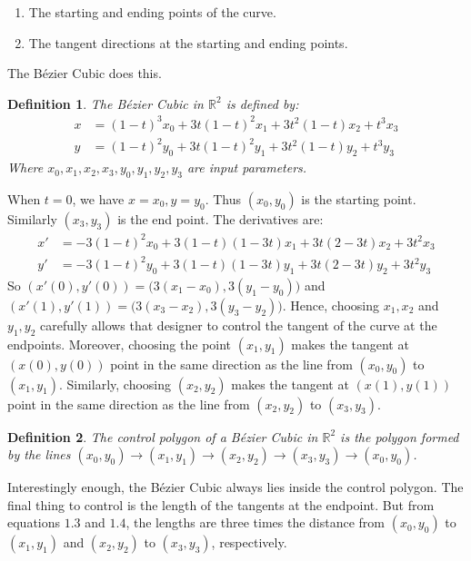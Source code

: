 \documentclass{article}
\theoremstyle{mystyle}
\newtheorem{definition}{Definition}[section]
\begin{document}
\begin{enumerate}
    \item The starting and ending points of the curve.
    \item The tangent directions at the starting and ending points.
\end{enumerate}
The B\'{e}zier Cubic does this.
\begin{definition}
The B\'{e}zier Cubic in $\mathbb{R}^2$ is defined by:
\begin{align*}
    x &= (1-t)^3 x_0+3t(1-t)^2x_1+3t^2(1-t)x_2+t^3x_3 \\
    y &= (1-t)^2 y_0+3t(1-t)^2y_1+3t^2(1-t)y_2+t^3y_3
\end{align*}
Where $x_0,x_1,x_2,x_3,y_0,y_1,y_2,y_3$ are input parameters.
\end{definition}
When $t=0$, we have $x = x_0, y=y_0$. Thus $(x_0,y_0)$ is the starting point. Similarly $(x_3,y_3)$ is the end point. The derivatives are:
\begin{align*}
    x' &= -3(1-t)^2x_0 + 3(1-t)(1-3t)x_1+3t(2-3t)x_2+3t^2x_3 \\
    y' &= -3(1-t)^2y_0 + 3(1-t)(1-3t)y_1+3t(2-3t)y_2+3t^2y_3
\end{align*}
So $(x'(0),y'(0)) = \big(3(x_1-x_0),3(y_1-y_0)\big)$ and $(x'(1),y'(1)) = \big(3(x_3-x_2),3(y_3-y_2)\big)$. Hence, choosing $x_1,x_2$ and $y_1,y_2$ carefully allows that designer to control the tangent of the curve at the endpoints. Moreover, choosing the point $(x_1,y_1)$ makes the tangent at $(x(0),y(0))$ point in the same direction as the line from $(x_0,y_0)$ to $(x_1,y_1)$. Similarly, choosing $(x_2,y_2)$ makes the tangent at $(x(1),y(1))$ point in the same direction as the line from $(x_2,y_2)$ to $(x_3,y_3)$.
\begin{definition}
The control polygon of a B\'{e}zier Cubic in $\mathbb{R}^2$ is the polygon formed by the lines $(x_0,y_0)\rightarrow(x_1,y_1)\rightarrow(x_2,y_2)\rightarrow(x_3,y_3)\rightarrow (x_0,y_0)$.
\end{definition}
Interestingly enough, the B\'{e}zier Cubic always lies inside the control polygon. The final thing to control is the length of the tangents at the endpoint. But from equations $1.3$ and $1.4$, the lengths are three times the distance from $(x_0,y_0)$ to $(x_1,y_1)$ and $(x_2,y_2)$ to $(x_3,y_3)$, respectively. 
\end{document}
